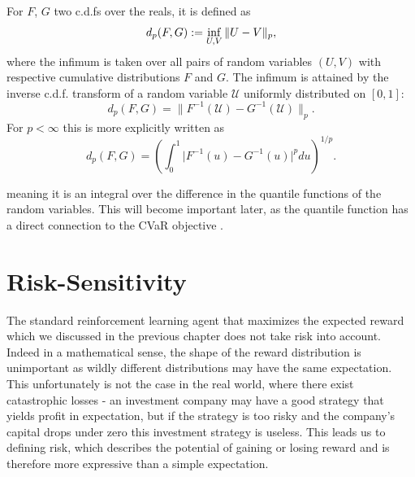 For $F$, $G$ two c.d.fs over the reals, it is defined as
\begin{equation*}
d_p(F, G) := \inf_{U, V} \| U - V \|_p,
\end{equation*}
where the infimum is taken over all pairs of random variables $(U, V)$ with respective cumulative distributions $F$ and $G$. The infimum is attained by the inverse c.d.f. transform of a random variable $\mathcal{U}$ uniformly distributed on $[0, 1]$:
\begin{equation*}
d_p(F, G) = \| F^{-1}(\mathcal{U}) - G^{-1}(\mathcal{U}) \|_p .
\end{equation*}
For $p < \infty$ this is more explicitly written as
\begin{equation}
d_p(F, G) = \left ( \int_0^1 \big | F^{-1}(u) - G^{-1}(u) \big |^p du \right )^{1/p} .
\end{equation}

meaning it is an integral over the difference in the quantile functions of the random variables. This will become important later, as the quantile function has a direct connection to the CVaR objective .




\section{Risk-Sensitivity}\label{sec:prelim:risk}

The standard reinforcement learning agent that maximizes the expected reward which we discussed in the previous chapter does not take risk into account. Indeed in a mathematical sense, the shape of the reward distribution is unimportant as wildly different distributions may have the same expectation. This unfortunately is not the case in the real world, where there exist catastrophic losses - an investment company may have a good strategy that yields profit in expectation, but if the strategy is too risky and the company's capital drops under zero this investment strategy is useless. This leads us to defining risk, which describes the potential of gaining or losing reward and is therefore more expressive than a simple expectation.

